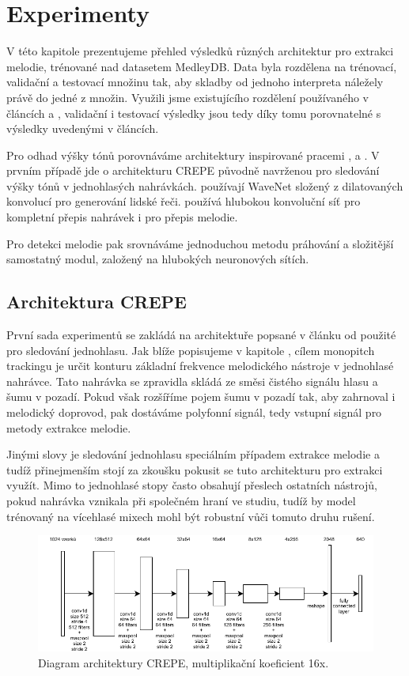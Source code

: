 \chapter{Experimenty}

V této kapitole prezentujeme přehled výsledků různých architektur pro extrakci melodie, trénované nad datasetem MedleyDB. Data byla rozdělena na trénovací, validační a testovací množinu tak, aby skladby od jednoho interpreta náležely právě do jedné z množin. Využili jsme existujícího rozdělení používaného v článcích \cite{Bittner2017} a \cite{DBasaranSEssid2018}, validační i testovací výsledky jsou tedy díky tomu porovnatelné s výsledky uvedenými v článcích.

Pro odhad výšky tónů porovnáváme architektury inspirované pracemi \cite{Kim2018}, \cite{Oord2016} a \cite{Bittner2017}. V prvním případě jde o architekturu CREPE původně navrženou pro sledování výšky tónů v jednohlasých nahrávkách. \cite{Oord2016} používají WaveNet složený z dilatovaných konvolucí pro generování lidské řeči. \cite{Bittner2017} používá hlubokou konvoluční síť pro kompletní přepis nahrávek i pro přepis melodie. 

Pro detekci melodie pak srovnáváme jednoduchou metodu práhování a složitější samostatný modul, založený na hlubokých neuronových sítích.

\section{Architektura CREPE}

První sada experimentů se zakládá na architektuře popsané v článku od \cite{Kim2018} použité pro sledování jednohlasu. Jak blíže popisujeme v kapitole , cílem monopitch trackingu je určit konturu základní frekvence melodického nástroje v jednohlasé nahrávce. Tato nahrávka se zpravidla skládá ze směsi čistého signálu hlasu a šumu v pozadí. Pokud však rozšíříme pojem šumu v pozadí tak, aby zahrnoval i melodický doprovod, pak dostáváme polyfonní signál, tedy vstupní signál pro metody extrakce melodie.

Jinými slovy je sledování jednohlasu speciálním případem extrakce melodie a tudíž přinejmenším stojí za zkoušku pokusit se tuto architekturu pro extrakci využít. Mimo to jednohlasé stopy často obsahují přeslech ostatních nástrojů, pokud nahrávka vznikala při společném hraní ve studiu, tudíž by model trénovaný na vícehlasé mixech mohl být robustní vůči tomuto druhu rušení. 

\begin{figure}[h]\centering
\includegraphics{../img/crepe_arch}
\caption{Diagram architektury CREPE, multiplikační koeficient 16x.}
\label{obr:wavenet_dilated}
\end{figure}

